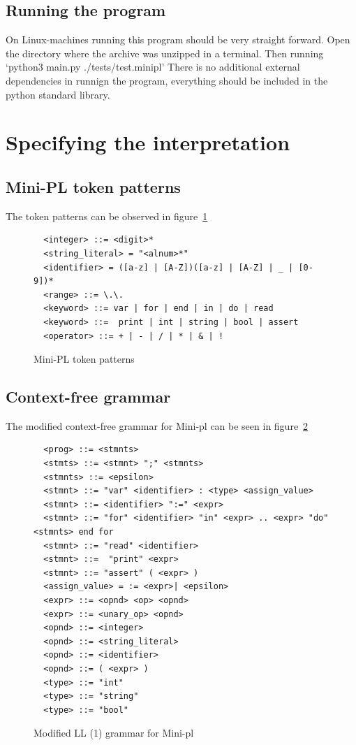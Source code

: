 \documentclass[12pt,a4paper]{article}
\begin{document}
\subsection{Running the program}

On Linux-machines running this program should be very straight forward.
Open the directory where the archive was unzipped in a terminal.
Then running 
`python3 main.py ./tests/test.minipl'
There is no additional external dependencies in runnign the program,
everything should be included in the python standard library.


\section{Specifying the interpretation}

\subsection{Mini-PL token patterns}
The token patterns can be observed in figure~\ref{token_patterns}
\begin{figure}\label{token_patterns}
  \caption{Mini-PL token patterns}
  \begin{verbatim}
  <integer> ::= <digit>*
  <string_literal> = "<alnum>*"
  <identifier> = ([a-z] | [A-Z])([a-z] | [A-Z] | _ | [0-9])*
  <range> ::= \.\.
  <keyword> ::= var | for | end | in | do | read 
  <keyword> ::=  print | int | string | bool | assert
  <operator> ::= + | - | / | * | & | !
  \end{verbatim}
\end{figure}

\subsection{Context-free grammar}
The modified context-free grammar for Mini-pl can be seen in figure~\ref{cfg}
\begin{figure}\label{cfg}
  \caption{Modified LL (1) grammar for Mini-pl}
  \begin{verbatim}
  <prog> ::= <stmnts>
  <stmts> ::= <stmnt> ";" <stmnts>
  <stmnts> ::= <epsilon>
  <stmnt> ::= "var" <identifier> : <type> <assign_value>
  <stmnt> ::= <identifier> ":=" <expr>
  <stmnt> ::= "for" <identifier> "in" <expr> .. <expr> "do" <stmnts> end for
  <stmnt> ::= "read" <identifier> 
  <stmnt> ::=  "print" <expr>
  <stmnt> ::= "assert" ( <expr> )
  <assign_value> = := <expr>| <epsilon>
  <expr> ::= <opnd> <op> <opnd>
  <expr> ::= <unary_op> <opnd>
  <opnd> ::= <integer>
  <opnd> ::= <string_literal>
  <opnd> ::= <identifier>
  <opnd> ::= ( <expr> )
  <type> ::= "int"
  <type> ::= "string"
  <type> ::= "bool"

  \end{verbatim}
\end{figure}
\end{document}
